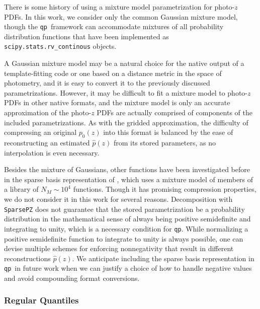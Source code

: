 \documentclass[\docopts]{\docclass}
\newcommand{\qp}{\texttt{qp}}
\newcommand{\pz}{photo-$z$ PDF}
\begin{document}
There is some history of using a mixture model parametrization for \pz s.  
  In this work, we consider only the common Gaussian mixture 
model, though the \qp\ framework can accommodate mixtures of all probability 
distribution functions that have been implemented as 
\texttt{scipy.stats.rv\_continous} objects.

A Gaussian mixture model may be a natural choice for the native output of a 
template-fitting code or one based on a distance metric in the space of 
photometry, and it is easy to convert it to the previously discussed 
parametrizations.  However, it may be difficult to fit a mixture model to \pz s 
in other native formats, and the mixture model is only an accurate 
approximation of the \pz s are actually comprised of components of the included 
parametrizations.  As with the gridded approximation, the difficulty of 
compressing an original $p_{0}(z)$ into this format is balanced by the ease of 
reconstructing an estimated $\hat{p}(z)$ from its stored parameters, as no 
interpolation is even necessary.

Besides the mixture of Gaussians, other functions have been investigated before 
in the sparse basis representation of \citet{carrasco_kind_sparse_2014}, which 
uses a mixture model of members of a library of $N_{M}\sim10^{4}$ functions.  
Though it has promising compression properties, we do not consider it in this 
work for several reasons.  Decomposition with \texttt{SparsePZ} does not 
guarantee that the stored parametrization be a probability distribution in the 
mathematical sense of always being positive semidefinite and integrating to 
unity, which is a necessary condition for \qp.  While normalizing a positive 
semidefinite function to integrate to unity is always possible, one can devise 
multiple schemes for enforcing nonnegativity that result in different 
reconstructions $\hat{p}(z)$.   We anticipate including the sparse basis 
representation in \qp\ in future work when we can justify a choice of how to 
handle negative values and avoid compounding format conversions.


\subsubsection{Regular Quantiles}
\label{sec:quantiles}
\end{document}

